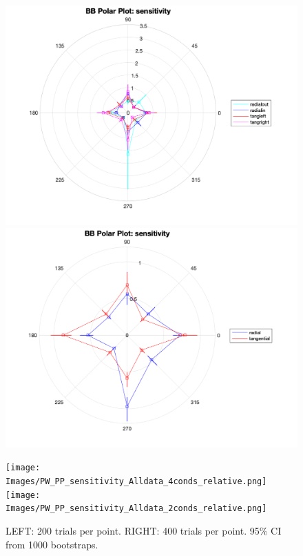 \documentclass[11pt]{article} %
\begin{document}
\begin{figure}[H]
\centering %
\includegraphics[scale=.3]{Images/BB_PP_sensitivity_Alldata_4conds.png}
\includegraphics[scale=.3]{Images/BB_PP_sensitivity_Alldata_2conds.png}
\end{figure}
\begin{figure}[H]
\centering %
\texttt{[image: Images/PW\_PP\_sensitivity\_Alldata\_4conds\_relative.png]}
\texttt{[image: Images/PW\_PP\_sensitivity\_Alldata\_2conds\_relative.png]}
\caption{LEFT: 200 trials per point. RIGHT: 400 trials per point. 95\% CI from 1000 bootstraps.}
\end{figure}

\newpage
\end{document}
